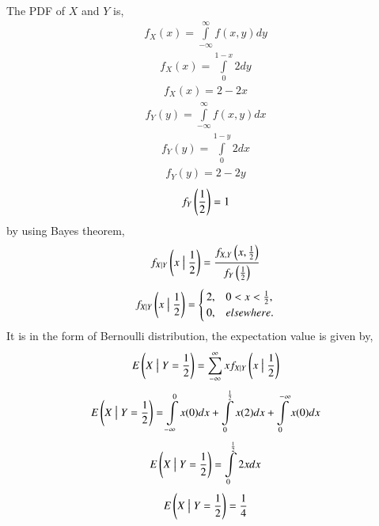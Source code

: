 
The PDF of $X$ and $Y$ is,
\begin{align}
    f_X(x)=\int\limits_{-\infty}^\infty f(x,y)d y
\end{align}
\begin{align}
    f_X(x)=\int\limits_0^{1-x}2d y
\end{align}
\begin{align}
    f_X(x)=2-2x
\end{align}
\begin{align}
    f_Y(y)=\int\limits_{-\infty}^\infty f(x,y)d x
\end{align}
\begin{align}
    f_Y(y)=\int\limits_0^{1-y}2d x
\end{align}
\begin{align}
    f_Y(y)=2-2y
\end{align}
\begin{align}
    f_Y\left(\frac{1}{2}\right)=1
\end{align}
by using Bayes theorem,
\begin{align}
    f_{X \mid Y}\left(x \bigm| \frac{1}{2}\right)=\frac{f_{X,Y}\left(x,\frac{1}{2}\right)}{f_Y\left(\frac{1}{2}\right)}
\end{align}
\begin{align}
    f_{X\mid Y}\left(x \bigm| \frac{1}{2}\right)=
    \begin{cases}
    2, & 0<x<\frac{1}{2},\\
    0, & elsewhere.
    \end{cases}
\end{align}
It is in the form of Bernoulli distribution, the expectation value is given by,
\begin{align}
    E\left(X\bigm| Y=\frac{1}{2}\right)=\sum\limits_{-\infty}^{\infty}x f_{X\mid Y}\left(x \bigm| \frac{1}{2}\right)
\end{align}
\begin{align}
    E\left(X\bigm| Y=\frac{1}{2}\right)=\int\limits_{-\infty}^0x(0)d x + \int\limits_0^\frac{1}{2}x(2)d x + \int\limits^{-\infty}_0x(0)d x
\end{align}
\begin{align}
    E\left(X\bigm| Y=\frac{1}{2}\right)=\int\limits_0^\frac{1}{2}2x d x
\end{align}
\begin{align}
    E\left(X\bigm| Y=\frac{1}{2}\right)=\frac{1}{4}
\end{align}
